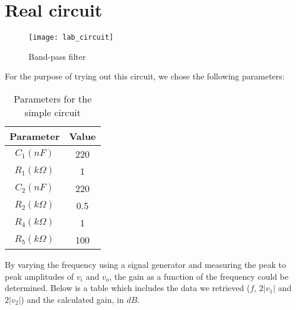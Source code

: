 \newpage

\section{Real circuit}
\label{sec:laboratory}

\begin{figure}[H]
\centering
\texttt{[image: lab\_circuit]}
\caption{Band-pass filter}
\label{circuit}
\end{figure}

For the purpose of trying out this circuit, we chose the following parameters:

\begin{table}[H]
\centering
\begin{tabular}{|c|c|}
        \hline
        Parameter & Value \\
        \hline
        $C_1 (nF)$ & 220 \\
        $R_1 (k\Omega)$ & 1 \\
        $C_2 (nF)$ & 220 \\
        $R_2 (k\Omega)$ & 0.5 \\
        $R_4 (k\Omega)$ & 1 \\
        $R_5 (k\Omega)$ & 100 \\
        \hline
\end{tabular}
\caption{Parameters for the simple circuit}
\label{simple_par}
\end{table}

By varying the frequency using a signal generator and measuring the peak to peak amplitudes of $v_i$ and $v_o$, the gain as a function of the frequency could be determined. Below is a table which includes the data we retrieved ($f$, $2|v_1|$ and $2|v_2|$) and the calculated gain, in $dB$.

